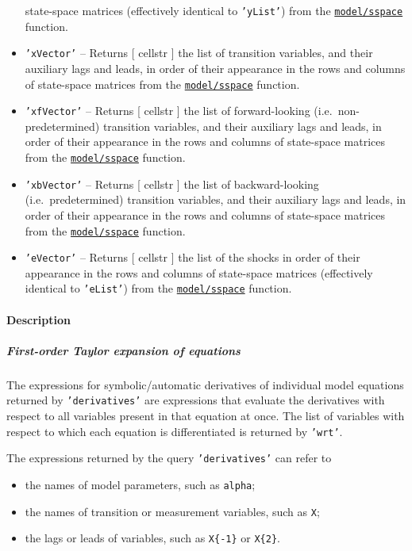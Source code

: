\begin{itemize}
  state-space matrices (effectively identical to \texttt{'yList'}) from
  the \href{model/sspace}{\texttt{model/sspace}} function.
\item
  \texttt{'xVector'} -- Returns {[} cellstr {]} the list of transition
  variables, and their auxiliary lags and leads, in order of their
  appearance in the rows and columns of state-space matrices from the
  \href{model/sspace}{\texttt{model/sspace}} function.
\item
  \texttt{'xfVector'} -- Returns {[} cellstr {]} the list of
  forward-looking (i.e.~non-predetermined) transition variables, and
  their auxiliary lags and leads, in order of their appearance in the
  rows and columns of state-space matrices from the
  \href{model/sspace}{\texttt{model/sspace}} function.
\item
  \texttt{'xbVector'} -- Returns {[} cellstr {]} the list of
  backward-looking (i.e.~predetermined) transition variables, and their
  auxiliary lags and leads, in order of their appearance in the rows and
  columns of state-space matrices from the
  \href{model/sspace}{\texttt{model/sspace}} function.
\item
  \texttt{'eVector'} -- Returns {[} cellstr {]} the list of the shocks
  in order of their appearance in the rows and columns of state-space
  matrices (effectively identical to \texttt{'eList'}) from the
  \href{model/sspace}{\texttt{model/sspace}} function.
\end{itemize}

\paragraph{Description}

\subparagraph{First-order Taylor expansion of
equations}

The expressions for symbolic/automatic derivatives of individual model
equations returned by \texttt{'derivatives'} are expressions that
evaluate the derivatives with respect to all variables present in that
equation at once. The list of variables with respect to which each
equation is differentiated is returned by \texttt{'wrt'}.

The expressions returned by the query \texttt{'derivatives'} can refer
to

\begin{itemize}
\itemsep1pt\parskip0pt
\item
  the names of model parameters, such as \texttt{alpha};
\item
  the names of transition or measurement variables, such as \texttt{X};
\item
  the lags or leads of variables, such as \texttt{X\{-1\}} or
  \texttt{X\{2\}}.
\end{itemize}

